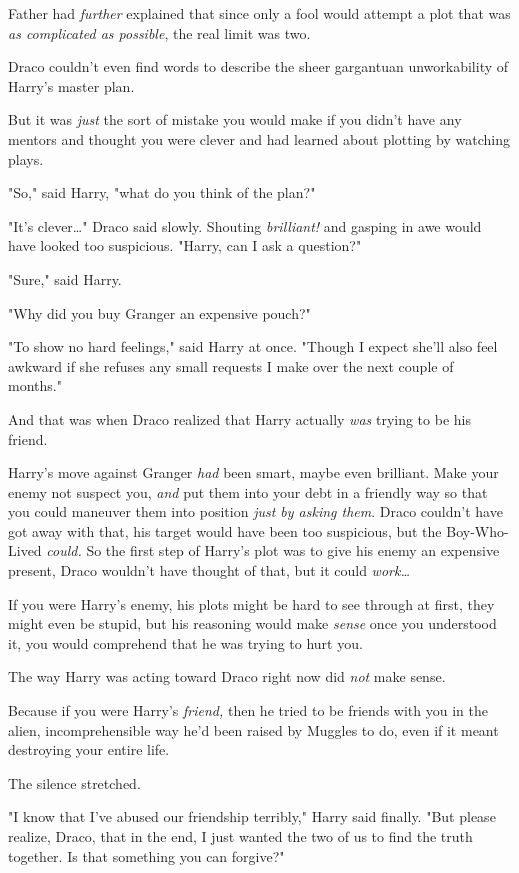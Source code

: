 Father had \emph{further} explained that since only a fool would attempt a plot
that was \emph{as complicated as possible}, the real limit was two.

Draco couldn't even find words to describe the sheer gargantuan unworkability
of Harry's master plan.

But it was \emph{just} the sort of mistake you would make if you didn't have
any mentors and thought you were clever and had learned about plotting by
watching plays.

"So," said Harry, "what do you think of the plan?"

"It's clever{\ldots}" Draco said slowly. Shouting \emph{brilliant!} and gasping
in awe would have looked too suspicious. "Harry, can I ask a question?"

"Sure," said Harry.

"Why did you buy Granger an expensive pouch?"

"To show no hard feelings," said Harry at once. "Though I expect she'll also
feel awkward if she refuses any small requests I make over the next couple of
months."

And that was when Draco realized that Harry actually \emph{was} trying to be
his friend.

Harry's move against Granger \emph{had} been smart, maybe even brilliant. Make
your enemy not suspect you, \emph{and} put them into your debt in a friendly
way so that you could maneuver them into position \emph{just by asking them}.
Draco couldn't have got away with that, his target would have been too
suspicious, but the Boy-Who-Lived \emph{could.} So the first step of Harry's
plot was to give his enemy an expensive present, Draco wouldn't have thought of
that, but it could \emph{work{\ldots}}

If you were Harry's enemy, his plots might be hard to see through at first,
they might even be stupid, but his reasoning would make \emph{sense} once you
understood it, you would comprehend that he was trying to hurt you.

The way Harry was acting toward Draco right now did \emph{not} make sense.

Because if you were Harry's \emph{friend,} then he tried to be friends with you
in the alien, incomprehensible way he'd been raised by Muggles to do, even if
it meant destroying your entire life.

The silence stretched.

"I know that I've abused our friendship terribly," Harry said finally. "But
please realize, Draco, that in the end, I just wanted the two of us to find the
truth together. Is that something you can forgive?"

